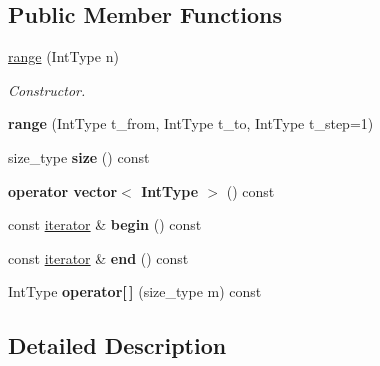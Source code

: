 \subsection*{Public Member Functions}
\begin{DoxyCompactItemize}
\item 
\hyperlink{classdscr_1_1range_a06f0f16f812d432d88dd8588f29f3181}{range} (Int\-Type n)
\begin{DoxyCompactList}\small\item\em Constructor. \end{DoxyCompactList}\item 
\hypertarget{classdscr_1_1range_a4ad29f26b18f04b589bff44b72cf4d3d}{{\bfseries range} (Int\-Type t\-\_\-from, Int\-Type t\-\_\-to, Int\-Type t\-\_\-step=1)}\label{classdscr_1_1range_a4ad29f26b18f04b589bff44b72cf4d3d}

\item 
\hypertarget{classdscr_1_1range_a5c6479d75d8a1e2309cf64eaa8502a3f}{size\-\_\-type {\bfseries size} () const }\label{classdscr_1_1range_a5c6479d75d8a1e2309cf64eaa8502a3f}

\item 
\hypertarget{classdscr_1_1range_a7089c881081d554ffd65408b43750875}{{\bfseries operator vector$<$ Int\-Type $>$} () const }\label{classdscr_1_1range_a7089c881081d554ffd65408b43750875}

\item 
\hypertarget{classdscr_1_1range_ab779841b574efbfe5ff839126d0d581d}{const \hyperlink{classdscr_1_1range_1_1iterator}{iterator} \& {\bfseries begin} () const }\label{classdscr_1_1range_ab779841b574efbfe5ff839126d0d581d}

\item 
\hypertarget{classdscr_1_1range_a63c2677015e157b5fbfb98d47cf28073}{const \hyperlink{classdscr_1_1range_1_1iterator}{iterator} \& {\bfseries end} () const }\label{classdscr_1_1range_a63c2677015e157b5fbfb98d47cf28073}

\item 
\hypertarget{classdscr_1_1range_af959a5570e78ea9aa1f9ffc088e8347d}{Int\-Type {\bfseries operator\mbox{[}$\,$\mbox{]}} (size\-\_\-type m) const }\label{classdscr_1_1range_af959a5570e78ea9aa1f9ffc088e8347d}

\end{DoxyCompactItemize}


\subsection{Detailed Description}
